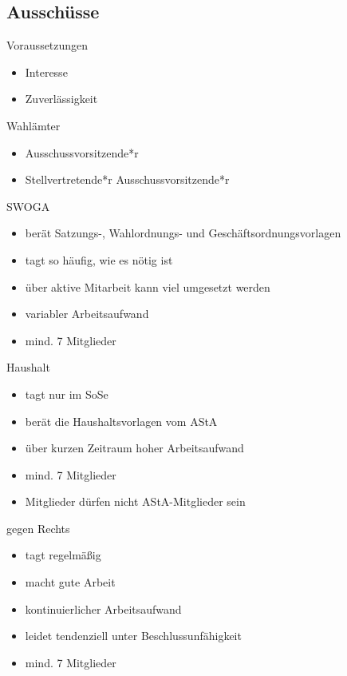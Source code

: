\documentclass{beamer}
\begin{document}
\subsection{Ausschüsse}

\begin{frame}{Voraussetzungen}
    \begin{itemize}
        \item Interesse
        \item Zuverlässigkeit
    \end{itemize}
\end{frame}

\begin{frame}{Wahlämter}
    \begin{itemize}
        \item Ausschussvorsitzende*r
        \item Stellvertretende*r Ausschussvorsitzende*r
    \end{itemize}
\end{frame}

\begin{frame}{SWOGA}
    \begin{itemize}
        \item berät Satzungs-, Wahlordnungs- und Geschäftsordnungsvorlagen
        \item tagt so häufig, wie es nötig ist
        \item über aktive Mitarbeit kann viel umgesetzt werden
        \item variabler Arbeitsaufwand
        \item mind. 7 Mitglieder
    \end{itemize}
\end{frame}

\begin{frame}{Haushalt}
    \begin{itemize}
        \item tagt nur im SoSe
        \item berät die Haushaltsvorlagen vom AStA
        \item über kurzen Zeitraum hoher Arbeitsaufwand
        \item mind. 7 Mitglieder
        \item Mitglieder dürfen nicht AStA-Mitglieder sein
    \end{itemize}
\end{frame}

\begin{frame}{gegen Rechts}
    \begin{itemize}
        \item tagt regelmäßig
        \item macht gute Arbeit
        \item kontinuierlicher Arbeitsaufwand
        \item leidet tendenziell unter Beschlussunfähigkeit
        \item mind. 7 Mitglieder
    \end{itemize}
\end{frame}
\end{document}
